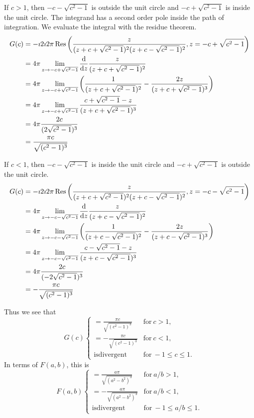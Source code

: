 {\begin{Solution}
  If $c > 1$, then $-c - \sqrt{c^2 - 1}$ is outside the unit circle and 
  $-c + \sqrt{c^2 - 1}$ is inside the unit circle.  The integrand 
  has a second order pole inside the path of integration.  We evaluate the 
  integral with the residue theorem.
  \begin{align*}
    G(c)    &= - \imath 2 \imath 2 \pi \mathop{\mathrm{Res}}\nolimits \left(
      \frac{ z }{ (z + c + \sqrt{c^2 - 1})^2 (z + c - \sqrt{c^2 - 1})^2 },
      z = -c + \sqrt{c^2 - 1} \right) \\
    &= 4 \pi \lim_{ z \to -c + \sqrt{c^2 - 1} } 
    \frac{\mathrm{d}}{\mathrm{d} z} \frac{ z }{ (z + c + \sqrt{c^2 - 1})^2 } \\
    &= 4 \pi \lim_{ z \to -c + \sqrt{c^2 - 1} } \left(
      \frac{ 1 }{ (z + c + \sqrt{c^2 - 1})^2 } 
      - \frac{ 2 z }{ (z + c + \sqrt{c^2 - 1})^3 } \right) \\
    &= 4 \pi \lim_{ z \to -c + \sqrt{c^2 - 1} } 
    \frac{ c + \sqrt{c^2-1} - z }{ (z + c + \sqrt{c^2 - 1})^3 } \\
    &= 4 \pi \frac{ 2 c }{ (2 \sqrt{c^2 - 1})^3 } \\
    &= \frac{ \pi c }{ \sqrt{(c^2 - 1)^3} } 
  \end{align*}

  If $c < 1$, then $-c - \sqrt{c^2 - 1}$ is inside the unit circle and 
  $-c + \sqrt{c^2 - 1}$ is outside the unit circle.  
  \begin{align*}
    G(c)    &= -\imath 2 \imath 2 \pi \mathop{\mathrm{Res}}\nolimits \left(
      \frac{ z }{ (z + c + \sqrt{c^2 - 1})^2 (z + c - \sqrt{c^2 - 1})^2 },
      z = -c - \sqrt{c^2 - 1} \right) \\
    &= 4 \pi \lim_{ z \to -c - \sqrt{c^2 - 1} } 
    \frac{\mathrm{d}}{\mathrm{d} z} \frac{ z }{ (z + c - \sqrt{c^2 - 1})^2 } \\
    &= 4 \pi \lim_{ z \to -c - \sqrt{c^2 - 1} } \left(
      \frac{ 1 }{ (z + c - \sqrt{c^2 - 1})^2 }
      - \frac{ 2 z }{ (z + c - \sqrt{c^2 - 1})^3 } \right) \\
    &= 4 \pi \lim_{ z \to -c - \sqrt{c^2 - 1} } 
    \frac{ c - \sqrt{c^2-1} - z }{ (z + c - \sqrt{c^2 - 1})^3 } \\
    &= 4 \pi \frac{ 2 c }{ (- 2 \sqrt{c^2 - 1})^3 } \\
    &= - \frac{ \pi c }{ \sqrt{(c^2 - 1)^3} } 
  \end{align*}

  Thus we see that
  \[
  G(c)
  \begin{cases}
    = \frac{ \pi c }{ \sqrt{(c^2 - 1)^3} } &\mathrm{for}\ c > 1, \\
    = - \frac{ \pi c }{ \sqrt{(c^2 - 1)^3} } &\mathrm{for}\ c < 1, \\
    \mathrm{is divergent} &\mathrm{for}\ -1 \leq c \leq 1.
  \end{cases}
  \]
  In terms of $F(a,b)$, this is
  \[
  F(a,b)
  \begin{cases}
    = \frac{ a \pi }{ \sqrt{(a^2 - b^2)^3} } &\mathrm{for}\ a/b > 1, \\
    = - \frac{ a \pi }{ \sqrt{(a^2 - b^2)^3} } &\mathrm{for}\ a/b < 1, \\
    \mathrm{is divergent} &\mathrm{for}\ -1 \leq a/b \leq 1.
  \end{cases}
  \]





\end{Solution}}
